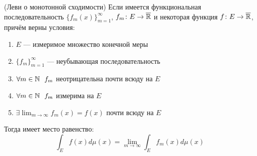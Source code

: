 \begin{theorem} (Леви о монотонной сходимости)
	Если имеется функциональная последовательность $\{f_m(x)\}_{m = 1}^\infty$, $f_m \colon E \to \overline{\mathbb{R}}$ и некоторая функция $f \colon E \to \overline{\mathbb{R}}$, причём верны условия:
	\begin{enumerate}
		\item $E$ --- измеримое множество конечной меры
		
		\item $\{f_m\}_{m = 1}^\infty$ --- неубывающая последовательность
		
		\item $\forall m \in \mathbb{N}\ \ f_m$ неотрицательна почти всюду на $E$
		
		\item $\forall m \in \mathbb{N}\ \ f_m$ измерима на $E$
		
		\item $\exists \lim_{m \to \infty} f_m(x) = f(x)$ почти всюду на $E$
	\end{enumerate}
	Тогда имеет место равенство:
	\[
		\int_E f(x)d\mu(x) = \lim_{m \to \infty} \int_E f_m(x)d\mu(x)
	\]
\end{theorem}

